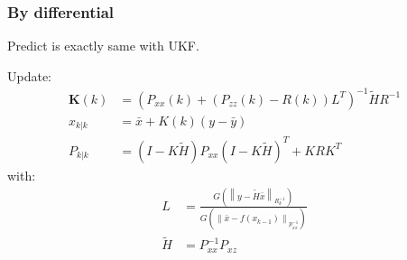 \documentclass[dvipdfmx]{jsarticle}
\begin{document}
\subsubsection*{By differential}
Predict is exactly same with UKF.

Update:
\begin{equation}\label{Func.}\begin{aligned}
  \mathbf{K}(k) &= (P_{xx}(k)+(P_{zz}(k)-R(k))L^{T})^{-1}\widetilde{H}R^{-1} \\
  x_{k|k} &= \bar{x}+K(k)(y-\bar{y}) \\
  P_{k|k} &= (I-K\widetilde{H})P_{xx}(I-K\widetilde{H})^T + KRK^T
\end{aligned}\end{equation}
with:
\begin{equation}\label{Func.}\begin{aligned}
  L &= \frac{G(\left\lVert y-\widetilde{H}\bar{x}\right\rVert_{R_{k}^{-1}})}{G(\left\lVert \bar{x}-f(x_{k-1})\right\rVert_{p_{xx}^{-1}})} \\
  \widetilde{H} &= P_{xx}^{-1}P_{xz}
\end{aligned}\end{equation}
\end{document}
